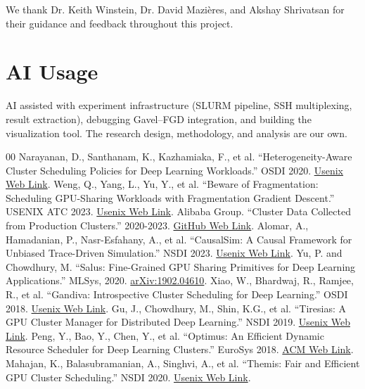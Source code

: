 \documentclass[conference]{IEEEtran}
\begin{document}
We thank Dr. Keith Winstein, Dr. David Mazi\`eres, and Akshay Shrivatsan for their guidance and feedback throughout this project.


\section*{AI Usage}
AI assisted with experiment infrastructure (SLURM pipeline, SSH multiplexing, result extraction), debugging Gavel--FGD integration, and building the visualization tool.
The research design, methodology, and analysis are our own.


\begin{thebibliography}{00}
 Narayanan, D., Santhanam, K., Kazhamiaka, F., et al. ``Heterogeneity-Aware Cluster Scheduling Policies for Deep Learning Workloads.'' OSDI 2020. \href{https://www.usenix.org/conference/osdi20/presentation/narayanan-deepak}{Usenix Web Link}.
 Weng, Q., Yang, L., Yu, Y., et al. ``Beware of Fragmentation: Scheduling GPU-Sharing Workloads with Fragmentation Gradient Descent.'' USENIX ATC 2023. \href{https://www.usenix.org/conference/atc23/presentation/weng}{Usenix Web Link}.
 Alibaba Group. ``Cluster Data Collected from Production Clusters.'' 2020-2023. \href{https://github.com/alibaba/clusterdata}{GitHub Web Link}.
 Alomar, A., Hamadanian, P., Nasr-Esfahany, A., et al. ``CausalSim: A Causal Framework for Unbiased Trace-Driven Simulation.'' NSDI 2023. \href{https://www.usenix.org/conference/nsdi23/presentation/alomar}{Usenix Web Link}.
 Yu, P. and Chowdhury, M. ``Salus: Fine-Grained GPU Sharing Primitives for Deep Learning Applications.'' MLSys, 2020. \href{https://arxiv.org/abs/1902.04610}{arXiv:1902.04610}.
 Xiao, W., Bhardwaj, R., Ramjee, R., et al. ``Gandiva: Introspective Cluster Scheduling for Deep Learning.'' OSDI 2018. \href{https://www.usenix.org/conference/osdi18/presentation/xiao}{Usenix Web Link}.
 Gu, J., Chowdhury, M., Shin, K.G., et al. ``Tiresias: A GPU Cluster Manager for Distributed Deep Learning.'' NSDI 2019. \href{https://www.usenix.org/conference/nsdi19/presentation/gu}{Usenix Web Link}.
 Peng, Y., Bao, Y., Chen, Y., et al. ``Optimus: An Efficient Dynamic Resource Scheduler for Deep Learning Clusters.'' EuroSys 2018. \href{https://dl.acm.org/doi/10.1145/3190508.3190517}{ACM Web Link}.
 Mahajan, K., Balasubramanian, A., Singhvi, A., et al. ``Themis: Fair and Efficient GPU Cluster Scheduling.'' NSDI 2020. \href{https://www.usenix.org/conference/nsdi20/presentation/mahajan}{Usenix Web Link}.

\end{thebibliography}
\end{document}
